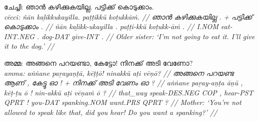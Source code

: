 \documentclass[a4paper]{article}
\begin{document}
\ex\begingl
\glpreamble ചേച്ചി: ഞാൻ കഴിക്കുകയില്ല. പട്ടിക്ക് കൊടുക്കാം. \\
\itshape cēcci: ñān kaḻikkukayilla. paṭṭikkŭ koṭukkāṁ. //
\gla ഞാൻ കഴിക്കുകയില്ല . + പട്ടിക്ക് കൊടുക്കാം . //
\glb ñān kaḻikk-ukayilla . paṭṭi-kkŭ koṭukk-āṁ . //
\glc I.NOM eat-INT.NEG . dog-DAT give-INT . //
\glft Older sister: `I'm not going to eat it. I'll give it to the dog.' //
\endgl\xe

\ex\begingl
\glpreamble അമ്മ: അങ്ങനെ പറയണ്ടാ, കേട്ടോ! നിനക്ക് അടി വേണോ? \\
\itshape amma: aṅṅane paṟayaṇṭā, kēṭṭō! ninakkŭ aṭi vēṇō? //
\gla അങ്ങനെ പറയണ്ട ആണ് , കേട്ടു ഓ ! + നിനക്ക് അടി വേണം ഓ ? //
\glb aṅṅane paṟay-aṇṭa āṇŭ , kēṭ-ṭu ō ! nin-akkŭ aṭi vēṇaṁ ō ? //
\glc that\_way speak-DES.NEG COP , hear-PST QPRT ! you-DAT spanking.NOM want.PRS QPRT ? //
\glft Mother: `You're not allowed to speak like that, did you hear! Do you want a spanking?' //
\endgl\xe
\end{document}
